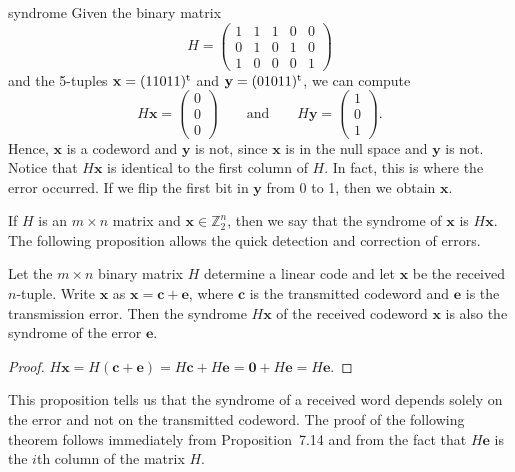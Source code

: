 \begin{example}{syndrome}
Given the binary matrix
\[
H =
\begin{pmatrix}
1 & 1 & 1 & 0 & 0 \\
0 & 1 & 0 & 1 & 0 \\
1 & 0 & 0 & 0 & 1
\end{pmatrix}
\]
and the 5-tuples ${\mathbf x} = (11011)^{\rm t}$ and ${\mathbf y} =
(01011)^{\rm t}$, we can compute
\[
H{\mathbf x} =
\begin{pmatrix}
0 \\ 0 \\ 0 
\end{pmatrix}
\qquad
\text{and}
\qquad
H{\mathbf y} =
\begin{pmatrix}
1 \\ 0 \\ 1 
\end{pmatrix}.
\]
Hence, ${\mathbf x}$ is a codeword and ${\mathbf y}$ is not, since
${\mathbf x}$ is in the null space and ${\mathbf y}$ is not. Notice that
$H{\mathbf x}$ is identical to the first column of $H$. In fact, this is
where the error occurred. If we flip the first bit in ${\mathbf y}$ from
0 to 1, then we obtain ${\mathbf x}$.  
\end{example}
 
 
If $H$ is an $m \times n$ matrix and ${\mathbf x} \in {\mathbb Z}_2^n$,
then we say that the {\bfi syndrome\/} of
${\mathbf x}$ is $H{\mathbf x}$. The following proposition allows
the quick detection and correction of errors.
 
 
\begin{proposition}
Let the $m \times n$ binary matrix $H$ determine a linear code and let
${\mathbf x}$ be the received $n$-tuple. Write ${\mathbf x}$ as ${\mathbf x}
=  {\mathbf c} +{\mathbf e}$, where ${\mathbf c}$ is the transmitted codeword
and ${\mathbf e}$ is the transmission error. Then the syndrome  $H{\mathbf
x}$ of the received codeword ${\mathbf x}$ is also the syndrome
of the error ${\mathbf e}$.
\end{proposition}
 
 
\begin{proof}
$H{\mathbf x} = H({\mathbf c} +{\mathbf e}) = H{\mathbf c} + H{\mathbf e} =
{\mathbf 0} + H{\mathbf e} = H{\mathbf e}$.  
\end{proof}
 
 
\medskip
 
 
This proposition tells us that the syndrome of a received word depends
solely on the error and not on the transmitted codeword. The proof of the
following theorem follows immediately from Proposition~7.14 and from
the fact that $H{\mathbf e}$ is the $i$th column of the matrix $H$.
 
